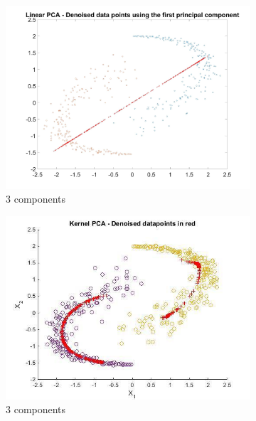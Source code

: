 \documentclass[11pt,oneside,a4paper]{article}
\begin{document}
\begin{figure}[H]
	\begin{subfigure}[b]{0.4\textwidth}
		\includegraphics[width=\textwidth]{../Figures/linaer_3}
		\caption{3 components}
	\end{subfigure}
	\begin{subfigure}[b]{0.4\textwidth}
		\includegraphics[width=\textwidth]{../Figures/kernal_3}
		\caption{3 components}
	\end{subfigure}
	\begin{subfigure}[b]{0.4\textwidth}

\end{subfigure}
\end{figure}
\end{document}
